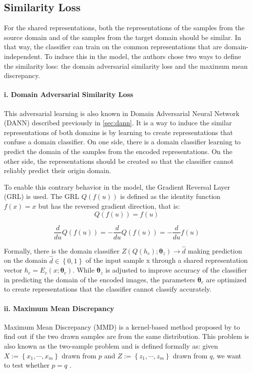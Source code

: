 \subsection*{Similarity Loss}
For the shared representations, both the representations of the samples from the source domain and of the samples from the target domain should be similar. In that way, the classifier can train on the common representations that are domain-independent. To induce this in the model, the authors chose two ways to define the similarity loss: the domain adversarial similarity loss and the maximum mean discrepancy. 

\paragraph*{i. Domain Adversarial Similarity Loss} This adversarial learning is also known in Domain Adversarial Neural Network (DANN) \cite{DAGanin} described previously in \ref{sec:dann}. It is a way to induce the similar representations of both domains is by learning to create representations that confuse a domain classifier. On one side, there is a domain classifier learning to predict the domain of the samples from the encoded representations. On the other side, the representations should be created so that the classifier cannot reliably predict their origin domain. 

To enable this contrary behavior in the model, the Gradient Reversal Layer (GRL) is used. The GRL $Q(f(u))$ is defined as the identity function $f(x) = x$ but has the reversed gradient direction, that is: 
	\begin{equation}
			Q(f(u)) = f(u)
	\end{equation}

	\begin{equation}
			\frac{d}{du}Q(f(u)) = -\frac{d}{du}Q(f(u)) = -\frac{d}{du}f(u)
	\end{equation}

Formally, there is the domain classifier $Z(Q(h_c);\bm{\theta}_z) \rightarrow \hat{d}$ making prediction on the domain $\hat{d} \in \left\{0, 1\right\}$ of the input sample x through a shared representation vector $h_c = E_c(x; \bm{\theta}_c)$. While $\bm{\theta}_z$ is adjusted to improve accuracy of the classifier in predicting the domain of the encoded images, the parameters $\bm{\theta}_c$ are optimized to create representations that the classifier cannot classify accurately. 

\paragraph*{ii. Maximum Mean Discrepancy} 
Maximum Mean Discrepancy (MMD) is a kernel-based method proposed by \cite{mmdOrig} to find out if the two drawn samples are from the same distribution. This problem is also known as the two-sample problem and is defined formally as: given $X := \left\{x_1, \cdots, x_m\right\}$ drawn from $p$ and $Z := \left\{z_1, \cdots, z_m\right\}$ drawn from $q$, we want to test whether $p=q$ \cite{mmdbio}. 

